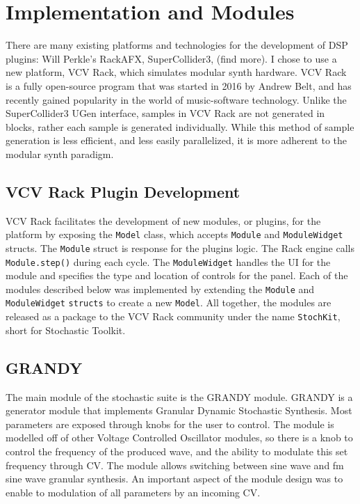 \documentclass[10pt]{article}
\begin{document}
\section{Implementation and Modules}
There are many existing platforms and technologies for the development of DSP plugins: Will Perkle's RackAFX, SuperCollider3, (find more).\citep{rackafx} I chose to use a new platform, VCV Rack, which simulates modular synth hardware. VCV Rack is a fully open-source program that was started in 2016 by Andrew Belt, and has recently gained popularity in the world of music-software technology.\citep{vcvrack} Unlike the SuperCollider3 UGen interface, samples in VCV Rack are not generated in blocks, rather each sample is generated individually. While this method of sample generation is less efficient, and less easily parallelized, it is more adherent to the modular synth paradigm.

\subsection{VCV Rack Plugin Development}

VCV Rack facilitates the development of new modules, or plugins, for the platform by exposing the \texttt{Model} class, which accepts \texttt{Module} and \texttt{ModuleWidget} structs. The \texttt{Module} struct is response for the plugins logic. The Rack engine calls \texttt{Module.step()} during each cycle. The \texttt{ModuleWidget} handles the UI for the module and specifies the type and location of controls for the panel. Each of the modules described below was implemented by extending the \texttt{Module} and \texttt{ModuleWidget} \texttt{structs} to create a new \texttt{Model}. All together, the modules are released as a package to the VCV Rack community under the name \texttt{StochKit}, short for Stochastic Toolkit.

\subsection{GRANDY}
The main module of the stochastic suite is the GRANDY module. GRANDY is a generator module that implements Granular Dynamic Stochastic Synthesis. Most parameters are exposed through knobs for the user to control. The module is modelled off of other Voltage Controlled Oscillator modules, so there is a knob to control the frequency of the produced wave, and the ability to modulate this set frequency through CV. The module allows switching between sine wave and fm sine wave granular synthesis. An important aspect of the module design was to enable to modulation of all parameters by an incoming CV.
\end{document}
